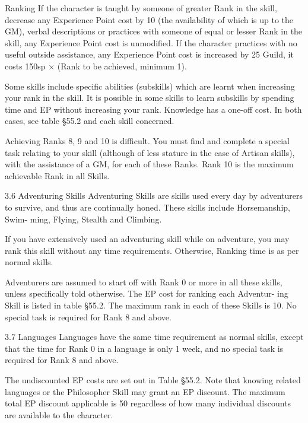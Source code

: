 \begin{Chapter}{Ranking}
If  the  character  is  taught  by  someone  of  greater 
Rank  in  the  skill,  decrease  any  Experience  Point 
cost  by  10%
(the availability of  which is up to the GM), verbal 
descriptions or practices with someone of equal or 
lesser Rank in the skill, any Experience Point cost 
is  unmodified.  If  the  character  practices  with  no 
useful  outside  assistance,  any  Experience  Point 
cost is increased by 25%
Guild,  it  costs  150sp  ×  (Rank  to  be  achieved, 
minimum 1). 

Some  skills  include  specific  abilities  (subskills) 
which  are  learnt  when  increasing  your  rank  in  the 
skill. It is possible in some skills to learn subskills 
by  spending  time  and  EP  without  increasing  your 
rank. Knowledge has a one-off cost. In both cases, 
see table §55.2 and each skill concerned. 

Achieving Ranks 8, 9 and 10 is difficult. You must 
find  and  complete  a  special  task  relating  to  your 
skill (although of less stature in the case of Artisan 
skills),  with  the  assistance  of  a  GM,  for  each  of 
these  Ranks.  Rank  10  is  the  maximum  achievable 
Rank in all Skills. 

3.6 Adventuring Skills 
Adventuring  Skills  are  skills  used  every  day  by 
adventurers  to  survive,  and  thus  are  continually 
honed.  These  skills  include  Horsemanship,  Swim-
ming, Flying, Stealth and Climbing. 

If  you  have  extensively  used  an  adventuring  skill 
while on adventure, you may rank this skill without 
any time requirements. Otherwise, Ranking time is 
as per normal skills. 

Adventurers  are  assumed  to  start  off  with  Rank  0 
or  more  in  all  these  skills,  unless  specifically  told 
otherwise. The EP cost for ranking each Adventur-
ing  Skill  is  listed  in  table  §55.2.  The  maximum 
rank in each of these Skills is 10. No special task is 
required for Rank 8 and above. 

3.7 Languages 
Languages  have  the  same  time  requirement  as 
normal skills, except that the time for Rank 0 in a 
language  is  only  1  week,  and  no  special  task  is 
required for Rank 8 and above. 

The  undiscounted  EP  costs  are  set  out  in  Table 
§55.2.  Note  that  knowing  related  languages  or  the 
Philosopher  Skill  may  grant  an  EP  discount.  The 
maximum  total  EP  discount  applicable  is  50%
regardless  of  how  many  individual  discounts  are 
available to the character. 


\end{Chapter}
